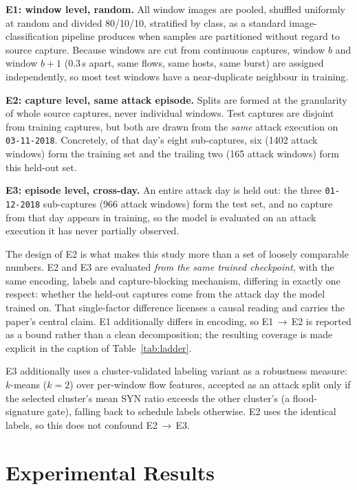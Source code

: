 \documentclass[conference]{IEEEtran} \IEEEoverridecommandlockouts
\begin{document}
\textbf{E1: window level, random.} All window images are pooled, shuffled
uniformly at random and divided 80/10/10, stratified by class, as a standard
image-classification pipeline produces when samples are partitioned without
regard to source capture. Because windows are cut from continuous
captures, window $b$ and window $b{+}1$ (0.3\,s apart, same flows, same hosts,
same burst) are assigned independently, so most test windows have a
near-duplicate neighbour in training.

\textbf{E2: capture level, same attack episode.} Splits are formed at the
granularity of whole source captures, never individual windows. Test captures
are disjoint from training captures, but both are drawn from the \emph{same}
attack execution on \texttt{03-11-2018}. Concretely, of that day's eight
sub-captures, six (1402 attack windows) form the training set and the trailing
two (165 attack windows) form this held-out set.

\textbf{E3: episode level, cross-day.} An entire attack day is held out: the
three \texttt{01-12-2018} sub-captures (966 attack windows) form the test set,
and no capture from that day appears in training, so the model is evaluated on
an attack execution it has never partially observed.

The design of E2 is what makes this study more than a set of loosely comparable
numbers. E2 and E3 are evaluated \emph{from the same trained checkpoint}, with
the same encoding, labels and capture-blocking mechanism, differing in exactly
one respect: whether the held-out captures come from the attack day the model
trained on. That single-factor difference licenses a causal reading and carries
the paper's central claim. E1 additionally differs in encoding, so E1\,$\to$\,E2 is
reported as a bound rather than a clean decomposition; the resulting coverage
is made explicit in the caption of Table~\ref{tab:ladder}.

E3 additionally uses a cluster-validated labeling variant as a robustness
measure: $k$-means ($k=2$) over per-window flow features, accepted as an attack
split only if the selected cluster's mean SYN ratio exceeds the other cluster's
(a flood-signature gate), falling back to schedule labels otherwise. E2 uses
the identical labels, so this does not confound E2\,$\to$\,E3.

\section{Experimental Results}
\label{sec:results}
\end{document}
